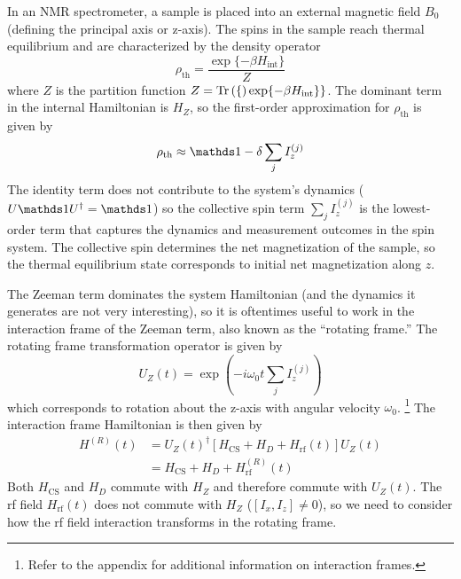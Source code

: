 In an NMR spectrometer, a sample is placed into an external magnetic field $B_0$ (defining the principal axis or z-axis).
The spins in the sample reach thermal equilibrium and are characterized by the density operator
\begin{equation}\label{eq:thermal-density-operator}
    \rho_{\text{th}} = \frac{
        \exp\{-\beta H_{\text{int}}\}
        }{Z}
\end{equation}
where $Z$ is the partition function $Z=\text{Tr}\left( \{ \right)\exp\{-\beta H_{\text{int}}\}\}$.
The dominant term in the internal Hamiltonian is $H_Z$, so the first-order approximation for $\rho_{\text{th}}$ is given by
\begin{equation}
    \rho_{\text{th}} \approx \identity - \delta \sum_j I_z^{(j)}
\end{equation}
The identity term does not contribute to the system's dynamics ($U \identity U^\dagger = \identity$) so the collective spin term $\sum_j I_z^{(j)}$ is the lowest-order term that captures the dynamics and measurement outcomes in the spin system. The collective spin determines the net magnetization of the sample, so the thermal equilibrium state corresponds to initial net magnetization along $z$.

The Zeeman term dominates the system Hamiltonian (and the dynamics it generates are not very interesting), so it is oftentimes useful to work in the interaction frame of the Zeeman term, also known as the ``rotating frame.''
The rotating frame transformation operator is given by
\begin{equation}
    U_Z(t) = \exp \left( -i \omega_0 t \sum_j I_z^{(j)} \right)
\end{equation}
which corresponds to rotation about the z-axis with angular velocity $\omega_0$.%
\footnote{
Refer to the appendix for additional information on interaction frames.
}
The interaction frame Hamiltonian is then given by
\begin{equation}
\begin{aligned}
    H^{(R)}(t) &= {U_Z(t)}^{\dagger} \left[ H_\text{CS} + H_D + H_\text{rf}(t) \right] U_Z(t) \\
        &= H_\text{CS} + H_D + H^{(R)}_\text{rf}(t)
\end{aligned}
\end{equation}
Both $H_\text{CS}$ and $H_D$ commute with $H_Z$ and therefore commute with $U_Z(t)$. The rf field $H_\text{rf}(t)$ does not commute with $H_Z$ ($[I_x, I_z] \ne 0$), so we need to consider how the rf field interaction transforms in the rotating frame.

